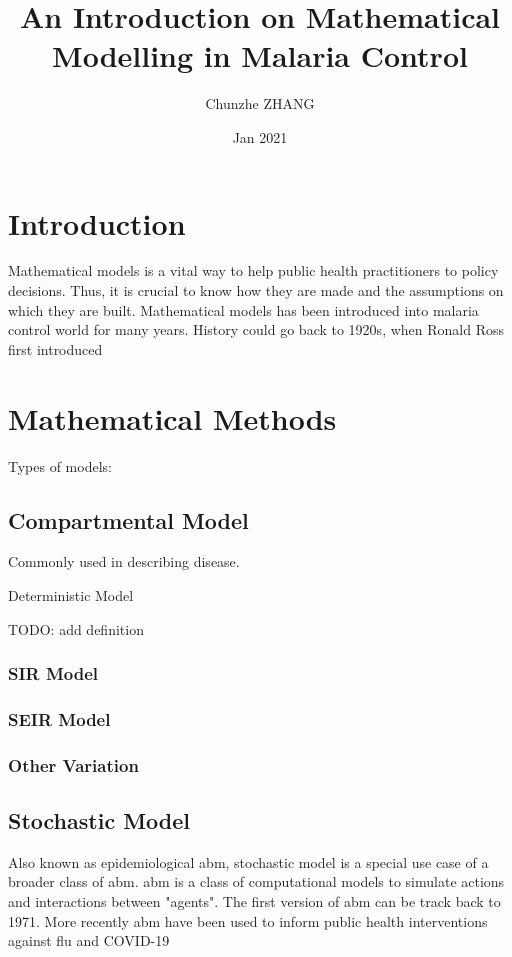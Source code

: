 \documentclass[a4paper, 12pt, twoside]{article}
\title{An Introduction on Mathematical Modelling in Malaria Control}
\author{Chunzhe ZHANG}
\date{Jan 2021}
\begin{document}
\begin{titlepage}
\maketitle
\end{titlepage}

\tableofcontents

\section{Introduction}
Mathematical models is a vital way to help public health practitioners to policy decisions. Thus, it is crucial to know how they are made and the assumptions on which they are built. Mathematical models has been introduced into malaria control world for many years. History could go back to 1920s, when Ronald Ross first introduced 
\section{Mathematical Methods}

Types of models:

\subsection{Compartmental Model}

Commonly used in describing disease. 

Deterministic Model 

TODO: add definition

\subsubsection{SIR Model}

\subsubsection{SEIR Model}

\subsubsection{Other Variation}

\subsection{Stochastic Model}
Also known as epidemiological \gls{abm}, stochastic model is a special use case of a broader class of \gls{abm}. \gls{abm} is a class of computational models to simulate actions and interactions between "agents". The first version of \gls{abm} can be track back to 1971\cite{Schelling1971}. More recently \gls{abm} have been used to inform public health interventions against flu\cite{Ferguson2006a, Ferguson2005} and COVID-19\cite{Maziarz2020, Ferguson2020, Chang2020}
\end{document}
